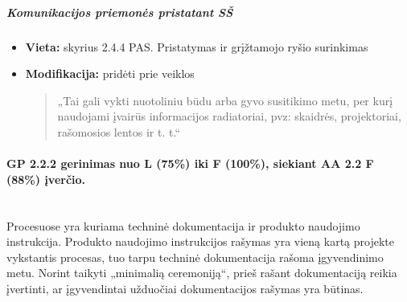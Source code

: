 \documentclass{article}
\newcommand{\subsubsubsection}[1]{\paragraph{#1}\mbox{}\\}
\begin{document}

\subparagraph{Komunikacijos priemonės pristatant SŠ}
\begin{itemize}
    \item \textbf{Vieta:} skyrius 2.4.4 PAS. Pristatymas ir grįžtamojo ryšio surinkimas
    \item \textbf{Modifikacija:} pridėti prie veiklos
    \begin{quote}
        „Tai gali vykti nuotoliniu būdu arba gyvo susitikimo metu, per kurį naudojami įvairūs informacijos radiatoriai, pvz: skaidrės, projektoriai, rašomosios lentos ir t. t.“
    \end{quote}
\end{itemize}

\subsubsubsection{GP 2.2.2 gerinimas nuo L (75\%) iki F (100\%), siekiant AA 2.2 F (88\%) įverčio.}

Procesuose yra kuriama techninė dokumentacija ir produkto naudojimo instrukcija. Produkto naudojimo instrukcijos rašymas yra vieną kartą projekte vykstantis procesas, tuo tarpu techninė dokumentacija rašoma įgyvendinimo metu. Norint taikyti „minimalią ceremoniją“, prieš rašant dokumentaciją reikia įvertinti, ar įgyvendintai užduočiai dokumentacijos rašymas yra būtinas.
\end{document}
